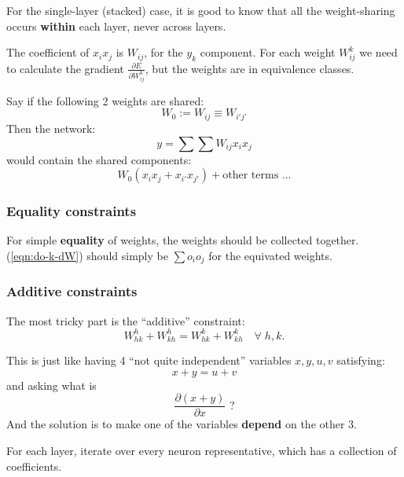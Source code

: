 For the single-layer (stacked) case, it is good to know that all the weight-sharing occurs \textbf{within} each layer, never across layers.

The coefficient of $x_i x_j$ is $W_{i j}$, for the $y_k$ component.  For each weight $W_{ij}^k$ we need to calculate the gradient $\displaystyle \frac{\partial E}{\partial W_{ij}^k}$, but the weights are in equivalence classes.

Say if the following 2 weights are shared:
\begin{equation}
W_0 := W_{i j} \equiv W_{i' j'}
\end{equation}
Then the network:
\begin{equation}
y = \sum \sum W_{ij} x_i x_j
\end{equation}
would contain the shared components:
\begin{equation}
W_0 ( x_i x_j + x_{i'} x_{j'} ) + \mbox{other terms ...}
\end{equation}

\subsubsection{Equality constraints}

For simple \textbf{equality} of weights, the weights should be collected together.  (\ref{eqn:do-k-dW}) should simply be $\sum o_i o_j$ for the equivated weights.

\subsubsection{Additive constraints}

The most tricky part is the ``additive'' constraint:
\begin{equation}
W_{hk}^h + W_{kh}^h = W_{hk}^k + W_{kh}^k \quad \forall \; h,k .
\end{equation}

This is just like having 4 ``not quite independent'' variables $x, y, u, v$ satisfying:
\begin{equation}
x + y = u + v
\end{equation}
and asking what is
\begin{equation}
\frac{\partial (x + y)}{\partial x} \mbox{ ?}
\end{equation}
And the solution is to make one of the variables \textbf{depend} on the other 3.

For each layer, iterate over every neuron representative, which has a collection of coefficients.

